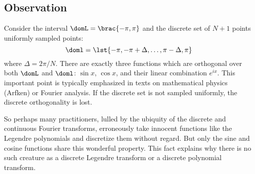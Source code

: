 \subsection{Observation}  %
Consider the interval $\domL = \brac{-\pi,\pi}$ and the discrete set of $N+1$ points uniformly sampled points:
$$\doml = \lst{-\pi,-\pi+\Delta,\dots,\pi-\Delta,\pi}$$
where $\Delta = 2\pi / N$. There are exactly three functions which are orthogonal over both $\domL$ and $\doml$: $\sin x$, $\cos x$, and their linear combination $e^{ix}$. This important point is typically emphasized in texts on mathematical physics (Arfken) or Fourier analysis. If the discrete set is not sampled uniformly, the discrete orthogonality is lost. 

So perhaps many practitioners, lulled by the ubiquity of the discrete and continuous Fourier transforms, erroneously take innocent functions like the Legendre polynomials and discretize them without regard. But only the sine and cosine functions share this wonderful property. This fact explains why there is no such creature as a discrete Legendre transform or a discrete polynomial transform.


\endinput %